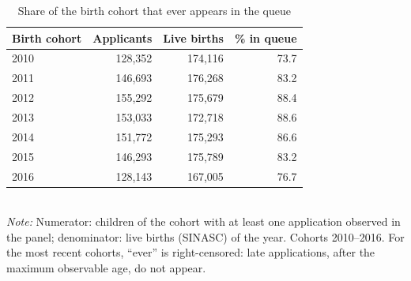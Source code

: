 \begin{table}[htbp]\centering
\caption{Share of the birth cohort that ever appears in the queue}
\label{tab:S8a}
\small
\begin{tabular}{lrrr}
\toprule
Birth cohort & Applicants & Live births & \% in queue \\
\midrule
2010 & 128,352 & 174,116 & 73.7 \\
2011 & 146,693 & 176,268 & 83.2 \\
2012 & 155,292 & 175,679 & 88.4 \\
2013 & 153,033 & 172,718 & 88.6 \\
2014 & 151,772 & 175,293 & 86.6 \\
2015 & 146,293 & 175,789 & 83.2 \\
2016 & 128,143 & 167,005 & 76.7 \\
\bottomrule
\end{tabular}
\\[3pt]{\footnotesize \textit{Note:} Numerator: children of the cohort with at least one application observed in the panel; denominator: live births (SINASC) of the year. Cohorts 2010--2016. For the most recent cohorts, ``ever'' is right-censored: late applications, after the maximum observable age, do not appear.}
\end{table}
